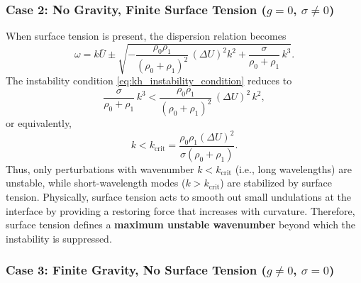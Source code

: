 \subsubsection*{Case 2: No Gravity, Finite Surface Tension ($g = 0$, $\sigma \neq 0$)}

When surface tension is present, the dispersion relation becomes
\begin{equation}
\omega = k \bar{U} 
\pm 
\sqrt{
-\frac{\rho_0 \rho_1}{(\rho_0 + \rho_1)^2}\,(\Delta U)^2 k^2
+ \frac{\sigma}{\rho_0 + \rho_1}\,k^3 }.
\end{equation}
The instability condition \eqref{eq:kh_instability_condition} reduces to
\begin{equation}
\frac{\sigma}{\rho_0 + \rho_1}\,k^3 
< 
\frac{\rho_0 \rho_1}{(\rho_0 + \rho_1)^2}\,(\Delta U)^2\,k^2,
\end{equation}
or equivalently,
\begin{equation}
k < k_{\mathrm{crit}} = \frac{\rho_0 \rho_1 (\Delta U)^2}{\sigma (\rho_0 + \rho_1)}.
\end{equation}
Thus, only perturbations with wavenumber $k < k_{\mathrm{crit}}$ (i.e., long wavelengths) are unstable, 
while short-wavelength modes ($k > k_{\mathrm{crit}}$) are stabilized by surface tension.  
Physically, surface tension acts to smooth out small undulations at the interface by providing a restoring force that increases with curvature.  
Therefore, surface tension defines a \textbf{maximum unstable wavenumber} beyond which the instability is suppressed.

\subsubsection*{Case 3: Finite Gravity, No Surface Tension ($g \neq 0$, $\sigma = 0$)}

